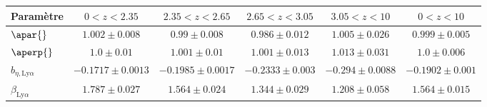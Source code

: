 \begin{table}[h]
\begin{tabular}{lccccc}
\toprule
Param\`etre  & $\num{0} < z < \num{2.35}$ & $\num{2.35} < z < \num{2.65}$ & $\num{2.65} < z < \num{3.05}$ & $\num{3.05} < z < \num{10}$  & $\num{0} < z < \num{10}$ \\
\midrule
$\apar{} $ & $ 1.002 \pm 0.008$ & $ 0.99 \pm 0.008$ & $ 0.986 \pm 0.012$ & $ 1.005 \pm 0.026$ & $ 0.999 \pm 0.005$ \\
$\aperp{} $ & $ 1.0 \pm 0.01$ & $ 1.001 \pm 0.01$ & $ 1.001 \pm 0.013$ & $ 1.013 \pm 0.031$ & $ 1.0 \pm 0.006$ \\
$b_{\eta, \mathrm{Ly}\alpha} $ & $ -0.1717 \pm 0.0013$ & $ -0.1985 \pm 0.0017$ & $ -0.2333 \pm 0.003$ & $ -0.294 \pm 0.0088$ & $ -0.1902 \pm 0.001$ \\
$\beta_{\mathrm{Ly}\alpha} $ & $ 1.787 \pm 0.027$ & $ 1.564 \pm 0.024$ & $ 1.344 \pm 0.029$ & $ 1.208 \pm 0.058$ & $ 1.564 \pm 0.015$ \\

\end{tabular}
\end{table}
